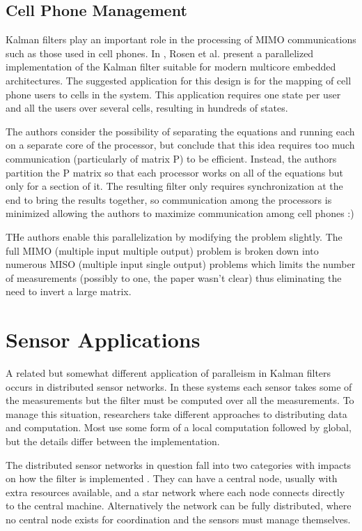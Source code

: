 \documentclass[11pt]{article}
\begin{document}
\subsection{Cell Phone Management}
Kalman filters play an important role in the processing of MIMO communications such as those used in cell phones. In \cite{rosen2013parallelization}, Rosen et al. present a parallelized implementation of the Kalman filter suitable for modern multicore embedded architectures. The suggested application for this design is for the mapping of cell phone users to cells in the system. This application requires one state per user and all the users over several cells, resulting in hundreds of states.

The authors consider the possibility of separating the equations and running each on a separate core of the processor, but conclude that this idea requires too much communication (particularly of matrix P) to be efficient. Instead, the authors partition the P matrix so that each processor works on all of the equations but only for a section of it. The resulting filter only requires synchronization at the end to bring the results together, so communication among the processors is minimized allowing the authors to maximize communication among cell phones :)

THe authors enable this parallelization by modifying the problem slightly. The full MIMO (multiple input multiple output) problem is broken down into numerous MISO (multiple input single output) problems which limits the number of measurements (possibly to one, the paper wasn't clear) thus eliminating the need to invert a large matrix.

\section{Sensor Applications}
A related but somewhat different application of paralleism in Kalman filters occurs in distributed sensor networks. In these systems each sensor takes some of the measurements but the filter must be computed over all the measurements.  To manage this situation, researchers take different approaches to distributing data and computation. Most use some form of a local computation followed by global, but the details differ between the implementation.

The distributed sensor networks in question fall into two categories with impacts on how the filter is implemented \cite{rao1991fully}. They can have a central node, usually with extra resources available, and a star network where each node connects directly to the central machine. Alternatively the network can be fully distributed, where no central node exists for coordination and the sensors must manage themselves.
\end{document}
